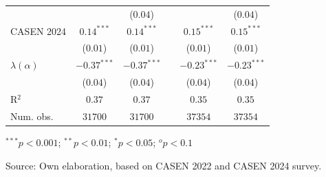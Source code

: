 \begin{table}[H]
\begin{center}
\begin{threeparttable}
\begin{tabular}{lccccc}
 & & ($0.04$) & & & ($0.04$) \\ 
CASEN 2024 & $0.14^{***}$& $0.14^{***}$ & & $0.15^{***}$& $0.15^{***}$ \\ 
 & ($0.01$)& ($0.01$) & & ($0.01$)& ($0.01$) \\ 
$\lambda(\alpha)$ & $-0.37^{***}$& $-0.37^{***}$ & & $-0.23^{***}$& $-0.23^{***}$ \\ 
 & ($0.04$)& ($0.04$) & & ($0.04$)& ($0.04$) \\ 
R$^2$ & $0.37$& $0.37$ & & $0.35$& $0.35$ \\ 
Num. obs. & $31700$& $31700$ & & $37354$& $37354$ \\ \bottomrule
\end{tabular}
\begin{tablenotes}
\item ${}^{***}p<0.001$; ${}^{**}p<0.01$; ${}^{*}p<0.05$; ${}^{o}p<0.1$
\item Source: Own elaboration, based on CASEN 2022 and CASEN 2024 survey.
\end{tablenotes}
\end{threeparttable}
\end{center}
\end{table}